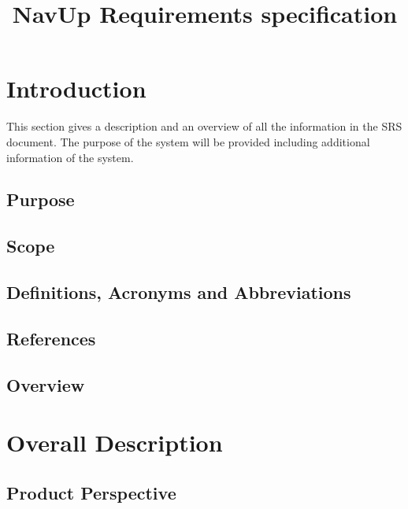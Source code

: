\documentclass{article}
\begin{document}
\title{NavUp Requirements specification}
\maketitle
\newpage
{\let\cleardoublepage\clearpage 
\maketitle
\tableofcontents
}
\section{Introduction}

This section gives a description and an overview of all the information in the SRS document. The purpose of the system will be provided including additional information of the system.

	\subsection{Purpose}
	
	
	\subsection{Scope}
	

	\subsection{Definitions, Acronyms and Abbreviations}
	
	
	\subsection{References}
	
	
	\subsection{Overview}
	
	
\section{Overall Description}
	\subsection{Product Perspective}
	
\end{document}

